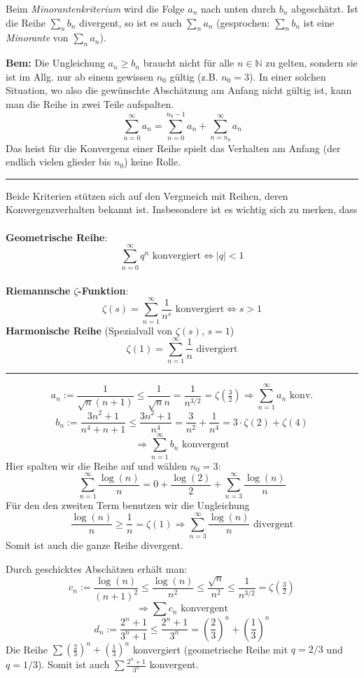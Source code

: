 \documentclass[a4paper,landscape,8pt]{extarticle}
\newcommand{\N}{\mathbb{N}}
\newcommand{\abs}[1]{\left\lvert #1 \right\rvert}
\newcommand{\sep}{\vspace{5pt}\noindent\hrule\vspace{5pt}}
\newcommand{\Bem}{\textbf{Bem: }}
\begin{document}
\begin{multicols*}{4}
Beim \emph{Minorantenkriterium} wird die Folge $a_n$ nach unten durch $b_n$
abgeschätzt. Ist die Reihe $\sum_n b_n$ divergent, so ist es auch $\sum_n a_n$
(gesprochen: $\sum_n b_n$ ist eine \emph{Minorante} von $\sum_n a_n$).

\Bem Die Ungleichung $a_n\geq b_n$ braucht nicht für alle $n\in \N$ zu gelten,
sondern sie ist im Allg. nur ab einem gewissen $n_0$ gültig (z.B. $n_0=3$). In
einer solchen Situation, wo also die gewünschte Abschätzung am Anfang nicht
gültig ist, kann man die Reihe in zwei Teile aufspalten.
\[
\sum_{n=0}^{\infty} a_n = \sum_{n=0}^{n_0-1} a_n + \sum_{n=n_0}^{\infty} a_n
\]
Das heist für die Konvergenz einer Reihe spielt das Verhalten am Anfang (der
endlich vielen glieder bis $n_0$) keine Rolle.

\sep

Beide Kriterien stützen sich auf den Vergmeich mit Reihen, deren
Konvergenzverhalten bekannt ist. Insbesondere ist es wichtig sich zu merken,
dass
\\
\\
\textbf{Geometrische Reihe}:
\[
\sum_{n=0}^{\infty} q^n \text{ konvergiert} \Longleftrightarrow \abs{q}<1
\]
\\
\textbf{Riemannsche} $\zeta$\textbf{-Funktion}:
\[
\zeta(s)=\sum_{n=1}^{\infty} \frac{1}{n^s} \text{ konvergiert}
\Longleftrightarrow s > 1
\]
\textbf{Harmonische Reihe} (Spezialvall von $\zeta(s)$, $s=1$)
\[
\zeta(1) = \sum_{n=1}^{\infty}\frac{1}{n} \text{ divergiert}
\]

\begin{warmup}
\sep

\Bsp
\[
a_n:=\frac{1}{\sqrt{n}(n+1)}\leq
\frac{1}{\sqrt{n}n}=\frac{1}{n^{3/2}}=\zeta(\tfrac{3}{2}) \Longrightarrow
\sum_{n=1}^{\infty} a_n \text{ konv.}
\]
\Bsp
\[
b_n:=\frac{3n^2+1}{n^4+n+1} \leq \frac{3n^2+1}{n^4}=\frac{3}{n^2}+\frac{1}{n^4}
= 3\cdot \zeta(2) + \zeta(4)\]
\[ \Longrightarrow \sum_{n=1}^{\infty} b_n
\text{ konvergent}
\]
\Bsp Hier spalten wir die Reihe auf und wählen $n_0	= 3$:
\[
\sum_{n=1}^{\infty}\frac{\log(n)}{n}
= 0 + \frac{\log(2)}{2}
+ \sum_{n=3}^{\infty}\frac{\log(n)}{n}
\]
Für den den zweiten Term benutzen wir die Ungleichung
\[
\frac{\log(n)}{n} \geq \frac{1}{n} = \zeta(1) \Longrightarrow
\sum_{n=3}^{\infty}\frac{\log(n)}{n} \text{ divergent}
\]
Somit ist auch die ganze Reihe divergent.

\Bsp Durch geschicktes Abschätzen erhält man:
\[
c_n:=\frac{\log(n)}{(n+1)^2} \leq
\frac{\log(n)}{n^2} \leq
\frac{\sqrt{n}}{n^2} \leq
\frac{1}{n^{3/2}} = \zeta(\tfrac{3}{2})
\]
\[
\Longrightarrow
\sum{c_n} \text{ konvergent} 
\]
\Bsp
\[
d_n:= \frac{2^n+1}{3^n+1} \leq
\frac{2^n+1}{3^n} =
\left(\frac{2}{3}\right)^n
+ \left(\frac{1}{3}\right)^n 
\]
Die Reihe $\sum \left(\frac{2}{3}\right)^n
+ \left(\frac{1}{3}\right)^n$ konvergiert (geometrische Reihe mit $q=2/3$ und
$q=1/3$). Somit ist auch $\sum \frac{2^n+1}{3^n}$ konvergent.


\end{warmup}
\end{multicols*}
\end{document}
